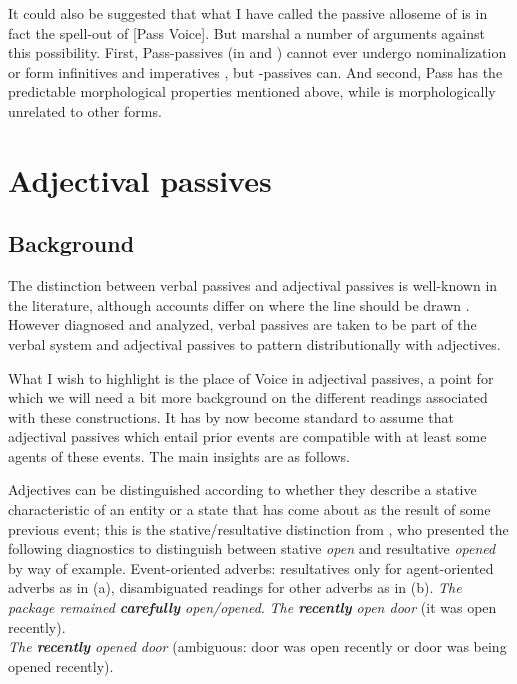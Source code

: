 It could also be suggested that what I have called the passive alloseme of {\vz} is in fact the spell-out of [Pass Voice]. But \cite{ahdoutkastner19nels} marshal a number of arguments against this possibility. First, Pass-passives (in {\tpua} and {\thif}) cannot ever undergo nominalization or form infinitives and imperatives \citep{kastnerzu17}, but {\vz}-passives can. And second, Pass has the predictable morphological properties mentioned above, while {\vz} is morphologically unrelated to other forms.\label{r1:5:4}


\section{Adjectival passives} \label{passn:adjpass}

	\subsection{Background}

The distinction between verbal passives and adjectival passives is well-known in the literature, although accounts differ on where the line should be drawn \citep{wasow77,levinrappaport86,borerwexler87,embick04li,alexiadouetal14,layering15,bruening14nllt}. However diagnosed and analyzed, verbal passives are taken to be part of the verbal system and adjectival passives to pattern distributionally with adjectives.

What I wish to highlight is the place of Voice in adjectival passives, a point for which we will need a bit more background on the different readings associated with these constructions. It has by now become standard to assume that adjectival passives which entail prior events are compatible with at least some agents of these events. The main insights are as follows.

Adjectives can be distinguished according to whether they describe a stative characteristic of an entity or a state that has come about as the result of some previous event; this is the stative/resultative distinction from \cite{embick04li}, who presented the following diagnostics to distinguish between stative \emph{open} and resultative \emph{opened} by way of example.
\pex Event-oriented adverbs: resultatives only for agent-oriented adverbs as in (a), disambiguated readings for other adverbs as in (b).
	\a \emph{The package remained \textbf{carefully} \xmark open/\cmark opened}.
	\a \emph{The \textbf{recently} open door} (it was open recently).\\
		\emph{The \textbf{recently} opened door} (ambiguous: door was open recently or door was being opened recently).
\xe

